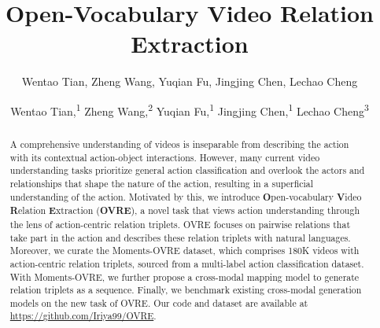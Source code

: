 \documentclass[letterpaper]{article}
\title{Open-Vocabulary Video Relation Extraction}
\author{
Wentao Tian, Zheng Wang, Yuqian Fu, Jingjing Chen, Lechao Cheng
}
\author {
    Wentao Tian,\textsuperscript{\rm 1}
    Zheng Wang,\textsuperscript{\rm 2} \equalcontrib
    Yuqian Fu,\textsuperscript{\rm 1}
    Jingjing Chen,\textsuperscript{\rm 1}\equalcontrib
    Lechao Cheng\textsuperscript{\rm 3}
}
\begin{document}
\maketitle
\begin{abstract}
A comprehensive understanding of videos is inseparable from describing the action with its contextual action-object interactions. However, many current video understanding tasks prioritize general action classification and overlook the actors and relationships that shape the nature of the action, resulting in a superficial understanding of the action.
Motivated by this, we introduce \textbf{O}pen-vocabulary  \textbf{V}ideo \textbf{R}elation \textbf{E}xtraction (\textbf{OVRE}), a novel task that views action understanding through the lens of action-centric relation triplets. OVRE focuses on pairwise relations that take part in the action and describes these relation triplets with natural languages. Moreover, we curate the Moments-OVRE dataset, which comprises 180K videos with action-centric relation triplets, sourced from a multi-label action classification dataset. With Moments-OVRE, we further propose a cross-modal mapping model to generate relation triplets as a sequence. Finally, we benchmark existing cross-modal generation models on the new task of OVRE. Our code and dataset are available at
\url{https://github.com/Iriya99/OVRE}.


\end{abstract}
\end{document}
